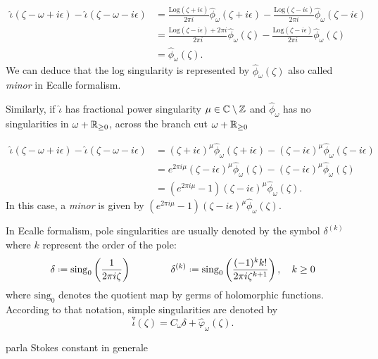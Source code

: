 \documentclass[11pt,a4paper,twoside,leqno,noamsfonts]{amsart}
\numberwithin{equation}{section}
\begin{document}
\begin{align*}
\hat{\iota}(\zeta-\omega+i\epsilon)-\hat{\iota}(\zeta-\omega-i\epsilon)&=\frac{\mathrm{Log}(\zeta+i\epsilon)}{2\pi i}\hat{\phi}_\omega(\zeta+i\epsilon)-\frac{\mathrm{Log}(\zeta-i\epsilon)}{2\pi i}\hat{\phi}_\omega(\zeta-i\epsilon)\\
&=\frac{\mathrm{Log}(\zeta-i\epsilon)+2\pi i}{2\pi i}\hat{\phi}_\omega(\zeta)-\frac{\mathrm{Log}(\zeta-i\epsilon)}{2\pi i}\hat{\phi}_\omega(\zeta)\\
&=\hat{\phi}_\omega(\zeta). 
\end{align*} 
We can deduce that the log singularity is represented by $\hat{\phi}_{\omega}(\zeta)$ also called \textit{minor} in Ecalle formalism. 

Similarly, if $\hat{\iota}$ has fractional power singularity $\mu\in\mathbb C\setminus\mathbb Z$ and $\hat{\phi}_{\omega}$ has no singularities in $\omega+\mathbb R_{\geq 0}$, across the branch cut $\omega+\mathbb R_{\geq 0}$ 

\begin{align*}
\hat{\iota}(\zeta-\omega+i\epsilon)-\hat{\iota}(\zeta-\omega-i\epsilon)&=(\zeta+i\epsilon)^{\mu}\hat{\phi}_\omega(\zeta+i\epsilon)- (\zeta-i\epsilon)^{\mu}\hat{\phi}_\omega(\zeta-i\epsilon)\\
&=e^{2\pi i\mu}(\zeta-i\epsilon)^\mu\hat{\phi}_\omega(\zeta)-(\zeta-i\epsilon)^{\mu}\hat{\phi}_\omega(\zeta)\\
&=(e^{2\pi i\mu}-1)(\zeta-i\epsilon)^{\mu}\hat{\phi}_{\omega}(\zeta).
\end{align*} 
In this case, a \textit{minor} is given by $(e^{2\pi i\mu}-1)(\zeta-i\epsilon)^{\mu}\hat{\phi}_{\omega}(\zeta)$. 

In Ecalle formalism, pole singularities are usually denoted by the symbol $\delta^{(k)}$ where $k$ represent the order of the pole:
\begin{align*}
\delta\defeq\mathrm{sing}_0\left(\frac{1}{2\pi i\zeta}\right) \qquad\qquad \delta^{(k)}\defeq\mathrm{sing}_0\left(\frac{(-1)^kk!}{2\pi i\zeta^{k+1}}\right),\quad k\geq 0
\end{align*}
where $\mathrm{sing}_0$ denotes the quotient map by germs of holomorphic functions. According to that notation, simple singularities are denoted by 
\begin{equation}
\overset{\triangledown}\iota(\zeta)=C_\omega\delta+\hat{\varphi}_{\omega}(\zeta).
\end{equation}  

\color{green}

parla Stokes constant in generale
\end{document}
